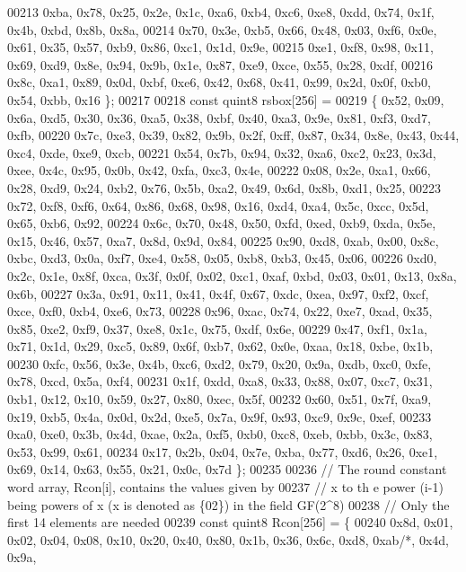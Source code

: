 \begin{DoxyCode}
00213       0xba, 0x78, 0x25, 0x2e, 0x1c, 0xa6, 0xb4, 0xc6, 0xe8, 0xdd, 0x74, 0x1f, 0x4b, 0xbd, 0x8b, 0x8a,
00214       0x70, 0x3e, 0xb5, 0x66, 0x48, 0x03, 0xf6, 0x0e, 0x61, 0x35, 0x57, 0xb9, 0x86, 0xc1, 0x1d, 0x9e,
00215       0xe1, 0xf8, 0x98, 0x11, 0x69, 0xd9, 0x8e, 0x94, 0x9b, 0x1e, 0x87, 0xe9, 0xce, 0x55, 0x28, 0xdf,
00216       0x8c, 0xa1, 0x89, 0x0d, 0xbf, 0xe6, 0x42, 0x68, 0x41, 0x99, 0x2d, 0x0f, 0xb0, 0x54, 0xbb, 0x16 \};
00217 
00218     \textcolor{keyword}{const} quint8 rsbox[256] =
00219     \{ 0x52, 0x09, 0x6a, 0xd5, 0x30, 0x36, 0xa5, 0x38, 0xbf, 0x40, 0xa3, 0x9e, 0x81, 0xf3, 0xd7, 0xfb,
00220       0x7c, 0xe3, 0x39, 0x82, 0x9b, 0x2f, 0xff, 0x87, 0x34, 0x8e, 0x43, 0x44, 0xc4, 0xde, 0xe9, 0xcb,
00221       0x54, 0x7b, 0x94, 0x32, 0xa6, 0xc2, 0x23, 0x3d, 0xee, 0x4c, 0x95, 0x0b, 0x42, 0xfa, 0xc3, 0x4e,
00222       0x08, 0x2e, 0xa1, 0x66, 0x28, 0xd9, 0x24, 0xb2, 0x76, 0x5b, 0xa2, 0x49, 0x6d, 0x8b, 0xd1, 0x25,
00223       0x72, 0xf8, 0xf6, 0x64, 0x86, 0x68, 0x98, 0x16, 0xd4, 0xa4, 0x5c, 0xcc, 0x5d, 0x65, 0xb6, 0x92,
00224       0x6c, 0x70, 0x48, 0x50, 0xfd, 0xed, 0xb9, 0xda, 0x5e, 0x15, 0x46, 0x57, 0xa7, 0x8d, 0x9d, 0x84,
00225       0x90, 0xd8, 0xab, 0x00, 0x8c, 0xbc, 0xd3, 0x0a, 0xf7, 0xe4, 0x58, 0x05, 0xb8, 0xb3, 0x45, 0x06,
00226       0xd0, 0x2c, 0x1e, 0x8f, 0xca, 0x3f, 0x0f, 0x02, 0xc1, 0xaf, 0xbd, 0x03, 0x01, 0x13, 0x8a, 0x6b,
00227       0x3a, 0x91, 0x11, 0x41, 0x4f, 0x67, 0xdc, 0xea, 0x97, 0xf2, 0xcf, 0xce, 0xf0, 0xb4, 0xe6, 0x73,
00228       0x96, 0xac, 0x74, 0x22, 0xe7, 0xad, 0x35, 0x85, 0xe2, 0xf9, 0x37, 0xe8, 0x1c, 0x75, 0xdf, 0x6e,
00229       0x47, 0xf1, 0x1a, 0x71, 0x1d, 0x29, 0xc5, 0x89, 0x6f, 0xb7, 0x62, 0x0e, 0xaa, 0x18, 0xbe, 0x1b,
00230       0xfc, 0x56, 0x3e, 0x4b, 0xc6, 0xd2, 0x79, 0x20, 0x9a, 0xdb, 0xc0, 0xfe, 0x78, 0xcd, 0x5a, 0xf4,
00231       0x1f, 0xdd, 0xa8, 0x33, 0x88, 0x07, 0xc7, 0x31, 0xb1, 0x12, 0x10, 0x59, 0x27, 0x80, 0xec, 0x5f,
00232       0x60, 0x51, 0x7f, 0xa9, 0x19, 0xb5, 0x4a, 0x0d, 0x2d, 0xe5, 0x7a, 0x9f, 0x93, 0xc9, 0x9c, 0xef,
00233       0xa0, 0xe0, 0x3b, 0x4d, 0xae, 0x2a, 0xf5, 0xb0, 0xc8, 0xeb, 0xbb, 0x3c, 0x83, 0x53, 0x99, 0x61,
00234       0x17, 0x2b, 0x04, 0x7e, 0xba, 0x77, 0xd6, 0x26, 0xe1, 0x69, 0x14, 0x63, 0x55, 0x21, 0x0c, 0x7d \};
00235 
00236     \textcolor{comment}{// The round constant word array, Rcon[i], contains the values given by}
00237     \textcolor{comment}{// x to th e power (i-1) being powers of x (x is denoted as \{02\}) in the field GF(2^8)}
00238     \textcolor{comment}{// Only the first 14 elements are needed}
00239     \textcolor{keyword}{const} quint8 Rcon[256] = \{
00240         0x8d, 0x01, 0x02, 0x04, 0x08, 0x10, 0x20, 0x40, 0x80, 0x1b, 0x36, 0x6c, 0xd8, 0xab\textcolor{comment}{/*, 0x4d, 0x9a,}

\end{DoxyCode}
